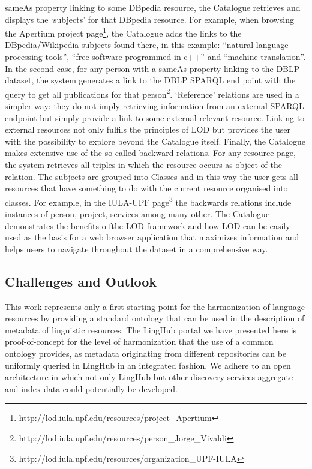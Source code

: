 \documentclass{llncs}
\begin{document}
{sameAs property linking to some DBpedia resource, the Catalogue retrieves and
displays the `subjects' for that DBpedia resource. For example, when browsing
the Apertium project
page\footnote{http://lod.iula.upf.edu/resources/project\_Apertium}, the
Catalogue adds the links to the DBpedia/Wikipedia subjects found there, in this
example: ``natural language processing tools'', ``free software programmed in
c++''
and ``machine translation''. In the second case, for any person with a sameAs
property linking to the DBLP dataset, the system generates a link to the DBLP
SPARQL end point with the query to get all publications for that
person\footnote{http://lod.iula.upf.edu/resources/person\_Jorge\_Vivaldi}. `Reference' relations are used in a simpler way: they do not imply retrieving information from an external SPARQL endpoint but simply provide a link to some external relevant resource. Linking to external resources not only fulfils the principles of LOD but provides the user with the possibility to explore beyond the Catalogue itself.
Finally, the Catalogue makes extensive use of the so called backward relations. For any resource page, the system retrieves all triples in which the resource occurs as object of the relation. The subjects are grouped into Classes and in this way the user gets all resources that have something to do with the current resource organised into classes. For example, in the IULA-UPF page\footnote{http://lod.iula.upf.edu/resources/organization\_UPF-IULA} the backwards relations include instances of person, project, services among many other.
The Catalogue demonstrates the benefits o fthe LOD framework and how LOD can be easily used as the basis for a web browser application that maximizes information and helps users to navigate throughout the dataset in a comprehensive way.

\subsection{Challenges and Outlook}
\label{sec:challenges}

This work represents only a first starting point for the harmonization of language resources by providing a standard ontology that can be used in the description of metadata of linguistic resources. The LingHub portal we have presented here is proof-of-concept for the level of harmonization that the use of a common ontology provides, as metadata originating from different repositories can be uniformly queried in LingHub in an integrated fashion. We adhere to an open architecture in which not only LingHub but other discovery services aggregate and index data could potentially be developed. 

}
\end{document}
